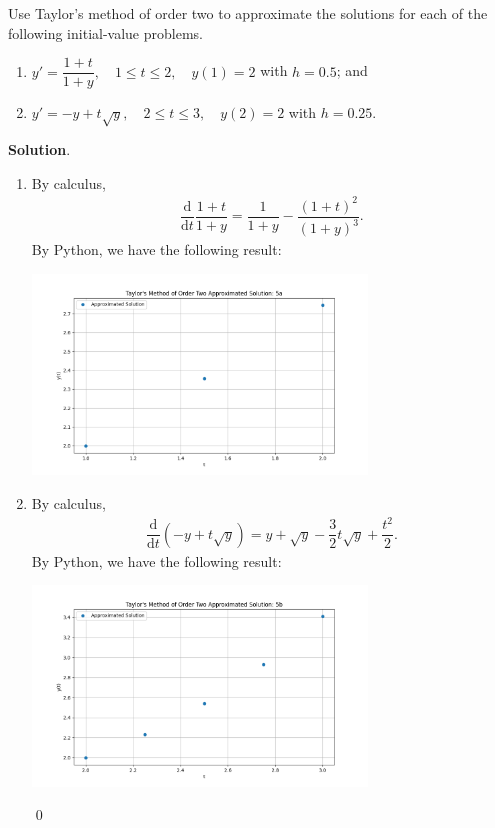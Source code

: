 \documentclass[11pt]{article}
\theoremstyle{break}
\newcommand{\dd}{\text{d}}
\numberwithin{equation}{theorem}
\begin{document}
\newpage
\begin{problem}\label{problem 5} %
    Use Taylor's method of order two to approximate the solutions for each of the following initial-value problems.
    \begin{enumerate}
        \item $y'=\dfrac{1+t}{1+y}, \quad 1\leq t\leq 2, \quad y(1)=2$ with $h=0.5$; and
        \item $y'=-y+t\sqrt{y}, \quad 2\leq t\leq 3, \quad y(2)=2$ with $h=0.25$.
    \end{enumerate}
\end{problem}
\textbf{Solution}. 
\begin{enumerate}
    \item By calculus, \begin{align*}
        \dfrac{\dd}{\dd t}\dfrac{1+t}{1+y}=\dfrac{1}{1+y}-\dfrac{(1+t)^2}{(1+y)^3}.
    \end{align*}
    By Python, we have the following result:
    \begin{center}
        \includegraphics[width=0.7\textwidth]{P5a.png}
    \end{center}
    \item By calculus, \begin{align*}
        \dfrac{\dd}{\dd t}\left(-y+t\sqrt{y}\right)=y+\sqrt{y}-\dfrac{3}{2}t\sqrt{y}+\dfrac{t^2}{2}.
    \end{align*}
    By Python, we have the following result:
    \begin{center}
        \includegraphics[width=0.7\textwidth]{P5b.png}
    \end{center} \qed
\end{enumerate}
\end{document}
